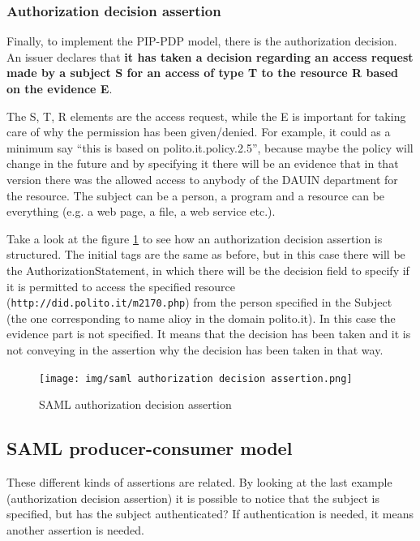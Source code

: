 \subsubsection{Authorization decision assertion}
Finally, to implement the PIP-PDP model, there is the authorization
decision. An issuer declares that \textbf{it has taken a decision
  regarding an access request made by a subject S for an access of
  type T to the resource R based on the evidence E}.

The S, T, R elements are the access request, while the E is important
for taking care of why the permission has been given/denied. For
example, it could as a minimum say “this is based on
polito.it.policy.2.5”, because maybe the policy will change in the
future and by specifying it there will be an evidence that in that
version there was the allowed access to anybody of the DAUIN
department for the resource. The subject can be a person, a program
and a resource can be everything (e.g. a web page, a file, a web
service etc.).

Take a look at the figure \ref{fig:saml-auth-decision-assertion} to
see how an authorization decision assertion is structured. 
The initial tags are the same as before, but in this case there will
be the AuthorizationStatement, in which there will be the decision
field to specify if it is permitted to access the specified resource
(\texttt{http://did.polito.it/m2170.php}) from the person specified in
the Subject (the one corresponding to name alioy in the domain
polito.it). In this case the evidence part is not specified. It means
that the decision has been taken and it is not conveying in the
assertion why the decision has been taken in that way.

\begin{figure}[H]
  \centering
  \texttt{[image: img/saml authorization
  decision assertion.png]}
  \label{fig:saml-auth-decision-assertion}
  \caption{SAML authorization decision assertion}
\end{figure}

\subsection{SAML producer-consumer model}
These different kinds of assertions are related. By looking at the
last example (authorization decision assertion) it is possible to
notice that the subject is specified, but has the subject
authenticated? If authentication is needed, it means another assertion
is needed.

